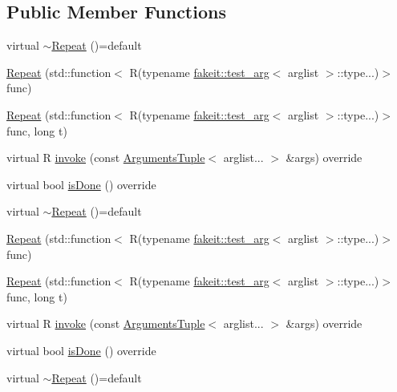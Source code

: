 \subsection*{Public Member Functions}
\begin{DoxyCompactItemize}
\item 
virtual \mbox{\hyperlink{structfakeit_1_1Repeat_a48edc25e2509018e7cc632fcf18eea42}{$\sim$\+Repeat}} ()=default
\item 
\mbox{\hyperlink{structfakeit_1_1Repeat_aee6893820759d2b0fa05975cdbac7e8c}{Repeat}} (std\+::function$<$ R(typename \mbox{\hyperlink{structfakeit_1_1test__arg}{fakeit\+::test\+\_\+arg}}$<$ arglist $>$\+::type...)$>$ func)
\item 
\mbox{\hyperlink{structfakeit_1_1Repeat_a3907a7a5430a75e296424f89c09b5eee}{Repeat}} (std\+::function$<$ R(typename \mbox{\hyperlink{structfakeit_1_1test__arg}{fakeit\+::test\+\_\+arg}}$<$ arglist $>$\+::type...)$>$ func, long t)
\item 
virtual R \mbox{\hyperlink{structfakeit_1_1Repeat_a64e8c3a413edce162acaec724e832e19}{invoke}} (const \mbox{\hyperlink{namespacefakeit_a476a37a598825e1b5dd67b3a176491a1}{Arguments\+Tuple}}$<$ arglist... $>$ \&args) override
\item 
virtual bool \mbox{\hyperlink{structfakeit_1_1Repeat_a4822600fad5bce408fcd03d71ff333eb}{is\+Done}} () override
\item 
virtual \mbox{\hyperlink{structfakeit_1_1Repeat_a48edc25e2509018e7cc632fcf18eea42}{$\sim$\+Repeat}} ()=default
\item 
\mbox{\hyperlink{structfakeit_1_1Repeat_aee6893820759d2b0fa05975cdbac7e8c}{Repeat}} (std\+::function$<$ R(typename \mbox{\hyperlink{structfakeit_1_1test__arg}{fakeit\+::test\+\_\+arg}}$<$ arglist $>$\+::type...)$>$ func)
\item 
\mbox{\hyperlink{structfakeit_1_1Repeat_a3907a7a5430a75e296424f89c09b5eee}{Repeat}} (std\+::function$<$ R(typename \mbox{\hyperlink{structfakeit_1_1test__arg}{fakeit\+::test\+\_\+arg}}$<$ arglist $>$\+::type...)$>$ func, long t)
\item 
virtual R \mbox{\hyperlink{structfakeit_1_1Repeat_a64e8c3a413edce162acaec724e832e19}{invoke}} (const \mbox{\hyperlink{namespacefakeit_a476a37a598825e1b5dd67b3a176491a1}{Arguments\+Tuple}}$<$ arglist... $>$ \&args) override
\item 
virtual bool \mbox{\hyperlink{structfakeit_1_1Repeat_a4822600fad5bce408fcd03d71ff333eb}{is\+Done}} () override
\item 
virtual \mbox{\hyperlink{structfakeit_1_1Repeat_a48edc25e2509018e7cc632fcf18eea42}{$\sim$\+Repeat}} ()=default

\end{DoxyCompactItemize}
